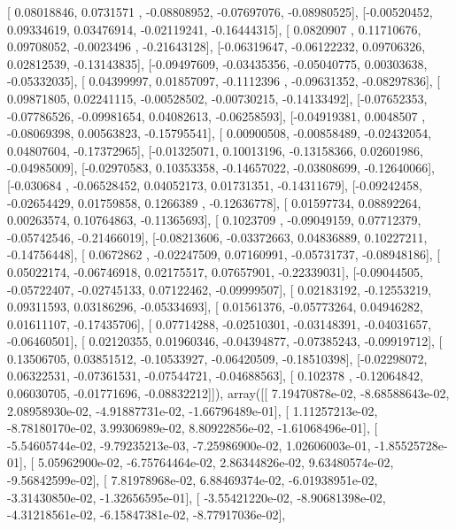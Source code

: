 \documentclass{article}
\begin{document}
       [ 0.08018846,  0.0731571 , -0.08808952, -0.07697076, -0.08980525],
       [-0.00520452,  0.09334619,  0.03476914, -0.02119241, -0.16444315],
       [ 0.0820907 ,  0.11710676,  0.09708052, -0.0023496 , -0.21643128],
       [-0.06319647, -0.06122232,  0.09706326,  0.02812539, -0.13143835],
       [-0.09497609, -0.03435356, -0.05040775,  0.00303638, -0.05332035],
       [ 0.04399997,  0.01857097, -0.1112396 , -0.09631352, -0.08297836],
       [ 0.09871805,  0.02241115, -0.00528502, -0.00730215, -0.14133492],
       [-0.07652353, -0.07786526, -0.09981654,  0.04082613, -0.06258593],
       [-0.04919381,  0.0048507 , -0.08069398,  0.00563823, -0.15795541],
       [ 0.00900508, -0.00858489, -0.02432054,  0.04807604, -0.17372965],
       [-0.01325071,  0.10013196, -0.13158366,  0.02601986, -0.04985009],
       [-0.02970583,  0.10353358, -0.14657022, -0.03808699, -0.12640066],
       [-0.030684  , -0.06528452,  0.04052173,  0.01731351, -0.14311679],
       [-0.09242458, -0.02654429,  0.01759858,  0.1266389 , -0.12636778],
       [ 0.01597734,  0.08892264,  0.00263574,  0.10764863, -0.11365693],
       [ 0.1023709 , -0.09049159,  0.07712379, -0.05742546, -0.21466019],
       [-0.08213606, -0.03372663,  0.04836889,  0.10227211, -0.14756448],
       [ 0.0672862 , -0.02247509,  0.07160991, -0.05731737, -0.08948186],
       [ 0.05022174, -0.06746918,  0.02175517,  0.07657901, -0.22339031],
       [-0.09044505, -0.05722407, -0.02745133,  0.07122462, -0.09999507],
       [ 0.02183192, -0.12553219,  0.09311593,  0.03186296, -0.05334693],
       [ 0.01561376, -0.05773264,  0.04946282,  0.01611107, -0.17435706],
       [ 0.07714288, -0.02510301, -0.03148391, -0.04031657, -0.06460501],
       [ 0.02120355,  0.01960346, -0.04394877, -0.07385243, -0.09919712],
       [ 0.13506705,  0.03851512, -0.10533927, -0.06420509, -0.18510398],
       [-0.02298072,  0.06322531, -0.07361531, -0.07544721, -0.04688563],
       [ 0.102378  , -0.12064842,  0.06030705, -0.01771696, -0.08832212]]), array([[  7.19470878e-02,  -8.68588643e-02,   2.08958930e-02,
         -4.91887731e-02,  -1.66796489e-01],
       [  1.11257213e-02,  -8.78180170e-02,   3.99306989e-02,
          8.80922856e-02,  -1.61068496e-01],
       [ -5.54605744e-02,  -9.79235213e-03,  -7.25986900e-02,
          1.02606003e-01,  -1.85525728e-01],
       [  5.05962900e-02,  -6.75764464e-02,   2.86344826e-02,
          9.63480574e-02,  -9.56842599e-02],
       [  7.81978968e-02,   6.88469374e-02,  -6.01938951e-02,
         -3.31430850e-02,  -1.32656595e-01],
       [ -3.55421220e-02,  -8.90681398e-02,  -4.31218561e-02,
         -6.15847381e-02,  -8.77917036e-02],
\end{document}
